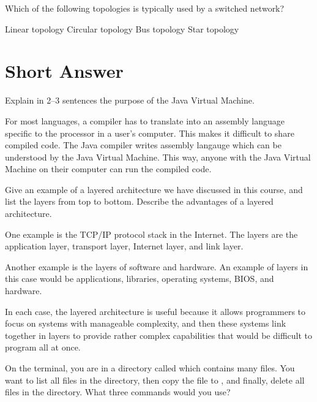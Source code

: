 \documentclass[answers,addpoints]{exam}
\begin{document}
\begin{questions}
\question[2] Which of the following topologies is typically used by a switched network?
\begin{choices}
    \choice Linear topology
    \choice Circular topology
    \choice Bus topology
    \CorrectChoice Star topology
\end{choices}

\section{Short Answer}

\question[5] Explain in 2--3 sentences the purpose of the Java Virtual Machine.

\begin{solution}
For most languages, a compiler has to translate into an assembly language specific to the processor in a user's computer. This makes it difficult to share compiled code. The Java compiler writes assembly langauge which can be understood by the Java Virtual Machine. This way, anyone with the Java Virtual Machine on their computer can run the compiled code.
\end{solution}

\question[5] Give an example of a layered architecture we have discussed in this course, and list the layers from top to bottom. Describe the advantages of a layered architecture.

\begin{solution}
    One example is the TCP/IP protocol stack in the Internet. The layers are the application layer, transport layer, Internet layer, and link layer. 

    Another example is the layers of software and hardware. An example of layers in this case would be applications, libraries, operating systems, BIOS, and hardware.

    In each case, the layered architecture is useful because it allows programmers to focus on systems with manageable complexity, and then these systems link together in layers to provide rather complex capabilities that would be difficult to program all at once.
\end{solution}

\question[5] On the terminal, you are in a directory called  which contains many files. You want to list all files in the directory, then copy the file  to , and finally, delete all  files in the  directory. What three commands would you use?


\end{questions}
\end{document}
